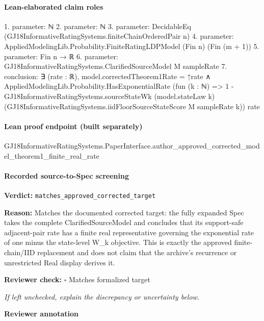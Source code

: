 \documentclass[10pt]{article}
\newcommand{\reviewerbox}{%
  \par\noindent\fbox{\parbox{0.96\linewidth}{\rule{0pt}{0.38in}}}\par
}
\newcommand{\reviewmatch}[1]{%
  \par\noindent\textbf{Reviewer check:} $\square$\; #1\par
  \noindent\emph{If left unchecked, explain the discrepancy or uncertainty below.}\par
}
\begin{document}
\paragraph{Lean-elaborated claim roles}\begin{ReviewVerbatim}
1. parameter: ℕ
2. parameter: ℕ
3. parameter: DecidableEq (GJ18InformativeRatingSystems.finiteChainOrderedPair n)
4. parameter: AppliedModelingLib.Probability.FiniteRatingLDPModel (Fin n) (Fin (m + 1))
5. parameter: Fin n → ℝ
6. parameter: GJ18InformativeRatingSystems.ClarifiedSourceModel M sampleRate
7. conclusion: ∃ (rate : ℝ),
  model.correctedTheorem1Rate = ↑rate ∧
    AppliedModelingLib.Probability.HasExponentialRate
      (fun (k : ℕ) =>
        1 -
          GJ18InformativeRatingSystems.sourceStateWk (model.stateLaw k)
            (GJ18InformativeRatingSystems.iidFloorSourceStateScore M sampleRate k))
      rate
\end{ReviewVerbatim}

\paragraph{Lean proof endpoint (built separately)}\begin{ReviewVerbatim}
GJ18InformativeRatingSystems.PaperInterface.author_approved_corrected_model_theorem1_finite_real_rate
\end{ReviewVerbatim}

\paragraph{Recorded source-to-Spec screening}
\textbf{Verdict:} \texttt{matches\_approved\_corrected\_target}
\\
{\raggedright
\textbf{Reason:} Matches the documented corrected target:\allowbreak{} the fully expanded Spec takes the complete ClarifiedSourceModel and concludes that its support-\allowbreak{}safe adjacent-\allowbreak{}pair rate has a finite real representative governing the exponential rate of one minus the state-\allowbreak{}level W\_\allowbreak{}k objective.\allowbreak{} This is exactly the approved finite-\allowbreak{}chain/\allowbreak{}IID replacement and does not claim that the archive's recurrence or unrestricted Real display derives it.\allowbreak{}
\par}
\reviewmatch{Matches formalized target}
\noindent\textbf{Reviewer annotation}\par
\reviewerbox
\end{document}
